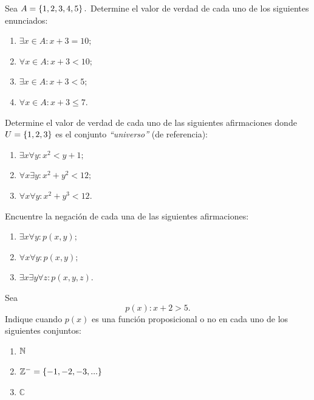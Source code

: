 \documentclass[xcolor={svgnames},
  hyperref={colorlinks}, 
  spanish, 12pt]{beamer}
\numberwithin{equation}{section} %
\numberwithin{figure}{section} %
\begin{document}
\begin{frame}
 \begin{solved}
  Sea $A=\left\{ 1,2,3,4,5 \right\}.$ Determine el valor de verdad de cada uno de los siguientes enunciados:
  \begin{enumerate}
   \item $\exists x \in A: x+3=10;$ \pause
   \item $\forall x \in A: x+3<10;$ \pause
   \item $\exists x \in A: x+3<5;$ \pause
   \item $\forall x \in A: x+3 \leq 7.$
  \end{enumerate}

 \end{solved}

\end{frame}

\begin{frame}
  \begin{solved}
    Determine el valor de verdad de cada uno de las siguientes afirmaciones donde $U=\left\{ 1,2,3 \right\}$ es el conjunto \emph{``universo''} (de referencia):
 \begin{enumerate}
  \item $\exists x \forall y: x^{2}< y+1;$ \pause
  \item $\forall x \exists y: x^{2}+y^{2}<12;$ \pause
  \item $\forall x \forall y: x^{2}+y^{3}<12.$
 \end{enumerate}

  \end{solved}

\end{frame}

\begin{frame}
 \begin{solved}
  Encuentre la negaci\'on de cada una de las siguientes afirmaciones:
  \begin{enumerate}
   \item $\exists x \forall y: p(x,y);$ \pause
   \item $\forall x \forall y: p(x,y);$ \pause
   \item $\exists x \exists y \forall z: p(x,y,z).$
  \end{enumerate}

 \end{solved}

\end{frame}

\begin{frame}
 \begin{solved}
  Sea $$p(x): x+2>5.$$ Indique cuando $p(x)$ es una funci\'on proposicional o no en cada uno de los siguientes conjuntos: 
  \begin{enumerate}
   \item $\mathbb{N}$ \pause
   \item $\mathbb{Z}^{-}=\left\{ -1,-2,-3,... \right\}$ \pause
   \item $\mathbb{C}$
  \end{enumerate}

 \end{solved}

\end{frame}
\end{document}
